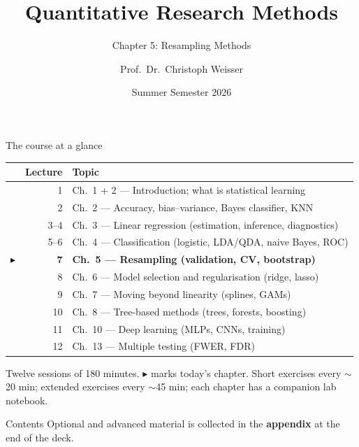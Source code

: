 \documentclass[aspectratio=169,11pt]{beamer}
\title{Quantitative Research Methods}
\subtitle{Chapter 5: Resampling Methods}
\author{Prof.\ Dr.\ Christoph Weisser}\institute{HSBI}
\date{Summer Semester 2026}\graphicspath{{images/}}
\begin{document}
\begin{frame}[plain]\titlepage\end{frame}

\begin{frame}{The course at a glance}
  \footnotesize
  \begin{center}
  \begin{tabular}{@{}c r l@{}}
    & \textbf{Lecture} & \textbf{Topic}\\
    \midrule
     & 1 & Ch.\ 1 + 2 --- Introduction; what is statistical learning \\
     & 2 & Ch.\ 2 --- Accuracy, bias--variance, Bayes classifier, KNN \\
     & 3--4 & Ch.\ 3 --- Linear regression (estimation, inference, diagnostics) \\
     & 5--6 & Ch.\ 4 --- Classification (logistic, LDA/QDA, naive Bayes, ROC) \\
    $\blacktriangleright$ & \textbf{7} & \textbf{Ch.\ 5 --- Resampling (validation, CV, bootstrap)} \\
     & 8 & Ch.\ 6 --- Model selection and regularisation (ridge, lasso) \\
     & 9 & Ch.\ 7 --- Moving beyond linearity (splines, GAMs) \\
     & 10 & Ch.\ 8 --- Tree-based methods (trees, forests, boosting) \\
     & 11 & Ch.\ 10 --- Deep learning (MLPs, CNNs, training) \\
     & 12 & Ch.\ 13 --- Multiple testing (FWER, FDR) \\
  \end{tabular}
  \end{center}
  \vspace{2pt}
  {\scriptsize Twelve sessions of 180 minutes. $\blacktriangleright$ marks today's chapter. Short exercises every $\sim$20 min; extended exercises every $\sim$45 min; each chapter has a companion lab notebook.}
\end{frame}


\begin{frame}{Contents}\small
  \tableofcontents[hideallsubsections]
  \vfill
  {\tiny Optional and advanced material is collected in the \textbf{appendix} at the end of the deck.}
\end{frame}
\end{document}
